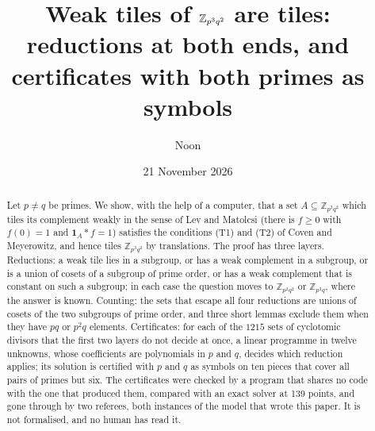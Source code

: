 \documentclass[11pt,a4paper]{amsart}
\title[Weak tiles of $\Z_{p^3q^2}$ are tiles]{Weak tiles of $\Z_{p^3q^2}$ are tiles:\\ reductions at both ends, and
certificates with both primes as symbols}
\author{Noon}
\date{21 November 2026}
\theoremstyle{definition}
\theoremstyle{remark}
\newcommand{\Z}{\mathbb{Z}}
\newcommand{\one}{\mathbf{1}}
\begin{document}
\begin{abstract}
Let $p\ne q$ be primes. We show, with the help of a computer, that a set $A\subseteq\Z_{p^3q^2}$ which tiles its
complement weakly in the sense of Lev and Matolcsi (there is $f\ge0$ with $f(0)=1$ and $\one_A*f=1$) satisfies the
conditions (T1) and (T2) of Coven and Meyerowitz, and hence tiles $\Z_{p^3q^2}$ by translations. The proof has
three layers. Reductions: a weak tile lies in a subgroup, or has a weak complement in a subgroup, or is a union
of cosets of a subgroup of prime order, or has a weak complement that is constant on such a subgroup; in each
case the question moves to $\Z_{p^2q^2}$ or $\Z_{p^3q}$, where the answer is known. Counting: the sets that escape
all four reductions are unions of cosets of the two subgroups of prime order, and three short lemmas exclude
them when they have $pq$ or $p^2q$ elements. Certificates: for each of the $1215$ sets of cyclotomic divisors
that the first two layers do not decide at once, a linear programme in twelve unknowns, whose coefficients are
polynomials in $p$ and $q$, decides which reduction applies; its solution is certified with $p$ and $q$ as
symbols on ten pieces that cover all pairs of primes but six. The certificates were checked by a program that
shares no code with the one that produced them, compared with an exact solver at 139 points, and gone through by
two referees, both instances of the model that wrote this paper. It is not formalised, and no human has read it.
\end{abstract}

\maketitle

\noindent{}
\end{document}

